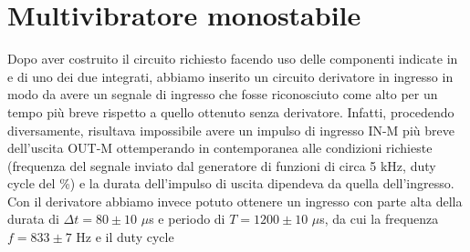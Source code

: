 \section{Multivibratore monostabile}
Dopo aver costruito il circuito richiesto facendo uso delle componenti indicate in  e di uno dei due integrati, abbiamo inserito un circuito derivatore in ingresso in modo da avere un segnale di ingresso che fosse riconosciuto come alto per un tempo più breve rispetto a quello ottenuto senza derivatore. Infatti, procedendo diversamente, risultava impossibile avere un impulso di ingresso IN-M più breve dell'uscita OUT-M ottemperando in contemporanea alle condizioni richieste (frequenza del segnale inviato dal generatore di funzioni di circa 5 kHz, duty cycle del \%) e la durata dell'impulso di uscita dipendeva da quella dell'ingresso. Con il derivatore abbiamo invece potuto ottenere un ingresso con parte alta della durata di $\Delta t = 80 \pm 10$ $\mu$s e periodo di $T = 1200 \pm 10$ $\mu$s, da cui la frequenza $f = 833 \pm 7$ Hz e il duty cycle 